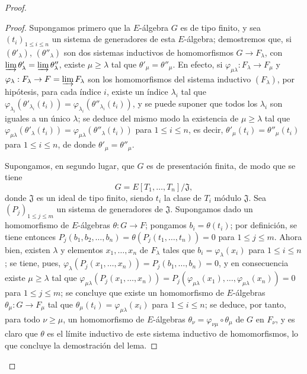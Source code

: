 \begin{proof}
\begin{proof}
Supongamos primero que la $E$-álgebra $G$ es de tipo finito, y sea $(t_i)_{1\leq i\leq n}$ un sistema de generadores de esta $E$-álgebra; demostremos que, si $(\theta'_\lambda)$, $(\theta''_\lambda)$ son dos sistemas inductivos de homomorfismos $G\to F_\lambda$, con $\varinjlim\theta'_\lambda=\varinjlim\theta''_\lambda$, existe $\mu\geq\lambda$ tal que $\theta'_\mu=\theta''_\mu$.
En efecto, si $\varphi_{\mu\lambda}:F_\lambda\to F_\mu$ y $\varphi_\lambda:F_\lambda\to F=\varinjlim F_\lambda$ son los homomorfismos del sistema inductivo $(F_\lambda)$, por hipótesis, para cada índice $i$, existe un índice $\lambda_i$ tal que $\varphi_{\lambda_i}(\theta'_{\lambda_i}(t_i))=
\varphi_{\lambda_i}(\theta''_{\lambda_i}(t_i))$, y se puede suponer que todos los $\lambda_i$ son iguales a un único $\lambda$; se deduce del mismo modo la existencia de $\mu\geq\lambda$ tal que $\varphi_{\mu\lambda}(\theta'_\lambda(t_i))=
\varphi_{\mu\lambda}(\theta''_\lambda(t_i))$ para $1\leq i\leq n$, es decir, $\theta'_\mu(t_i)=\theta''_\mu(t_i)$ para $1\leq i\leq n$, de donde $\theta'_\mu=\theta''_\mu$.

Supongamos, en segundo lugar, que $G$ es de presentación finita, de modo que se tiene
\[
G=E[T_1,\ldots,T_n]/\mathfrak J,
\]
donde $\mathfrak J$ es un ideal de tipo finito, siendo $t_i$ la clase de $T_i$ módulo $\mathfrak J$.
Sea $(P_j)_{1\leq j\leq m}$ un sistema de generadores de $\mathfrak J$.
Supongamos dado un homomorfismo de $E$-álgebras $\theta:G\to F$; pongamos $b_i=\theta(t_i)$; por definición, se tiene entonces $P_j(b_1,b_2,\ldots,b_n)=\theta(P_j(t_1,\ldots,t_n))=0$ para $1\leq j\leq m$.
Ahora bien, existen $\lambda$ y elementos $x_1,\ldots,x_n$ de $F_\lambda$ tales que $b_i=\varphi_\lambda(x_i)$ para $1\leq i\leq n$; se tiene, pues, $\varphi_\lambda(P_j(x_1,\ldots,x_n))=P_j(b_1,\ldots,b_n)=0$, y en consecuencia existe $\mu\geq\lambda$ tal que $\varphi_{\mu\lambda}(P_j(x_1,\ldots,x_n))=
P_j(\varphi_{\mu\lambda}(x_1),\ldots,\varphi_{\mu\lambda}(x_n))=0$ para $1\leq j\leq m$; se concluye que existe un homomorfismo de $E$-álgebras $\theta_\mu:G\to F_\mu$ tal que $\theta_\mu(t_i)=\varphi_{\mu\lambda}(x_i)$
para $1\leq i\leq n$; se deduce, por tanto, para todo $\nu\geq\mu$, un homomorfismo de $E$-álgebras $\theta_\nu=\varphi_{\nu\mu}\circ\theta_\mu$ de $G$ en $F_\nu$, y es claro que $\theta$ es el límite inductivo de este sistema inductivo de homomorfismos, lo que concluye la demostración del lema.
\end{proof}


\end{proof}
